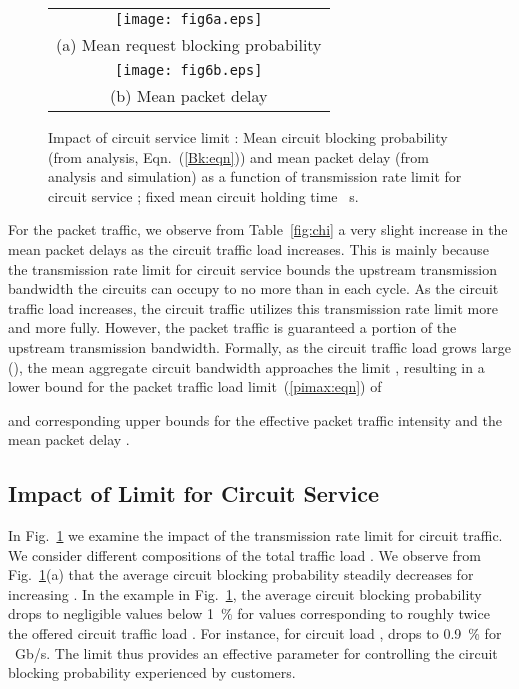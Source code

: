 \documentclass[article]{IEEEtran}
\begin{document}
\begin{figure}[t]
\begin{tabular}{c}
\texttt{[image: fig6a.eps]}  \\
{\scriptsize (a) Mean request blocking probability } \\
\texttt{[image: fig6b.eps]}   \\
{\scriptsize (b) Mean packet delay } \\
\end{tabular}
\caption{Impact of circuit service limit :
Mean circuit blocking probability 
(from analysis, Eqn.~(\ref{Bk:eqn}))
and mean packet delay  (from analysis and simulation)
as a function of transmission rate limit for circuit service ;
fixed mean circuit holding time ~s. }
\label{fig:Cc}
\end{figure}
For the packet traffic, we observe from
Table~\ref{fig:chi} a very slight increase in the mean packet delays 
as the circuit traffic load  increases.
This is mainly because the transmission rate limit  for circuit
service bounds the upstream transmission bandwidth the circuits
can occupy to no more than  in each cycle.
As the circuit traffic load  increases, the circuit traffic
utilizes this transmission rate limit  more and more fully.
However, the packet traffic is guaranteed a portion
 of the upstream transmission bandwidth.
Formally, as the circuit traffic load  grows large
(), the
mean aggregate circuit bandwidth  approaches the limit
, resulting in a lower bound for the packet traffic load
limit~(\ref{pimax:eqn}) of

and corresponding upper bounds for the
effective packet traffic intensity  and
the mean packet delay .


\subsection{Impact of Limit  for Circuit Service}
\label{Cc_impact:sec} In Fig.~\ref{fig:Cc} we examine the impact of
the transmission rate limit  for circuit traffic. We consider
different compositions  of the total traffic load . We observe from Fig.~\ref{fig:Cc}(a) that the average
circuit blocking probability  steadily decreases for
increasing . In the example in Fig.~\ref{fig:Cc}, the average
circuit blocking probability  drops to negligible values
below 1~\% for  values corresponding to roughly twice the
offered circuit traffic load . For instance, for circuit load
,  drops to 0.9~\% for ~Gb/s. The
limit  thus provides an effective parameter for controlling
the circuit blocking probability experienced by customers.
\end{document}
